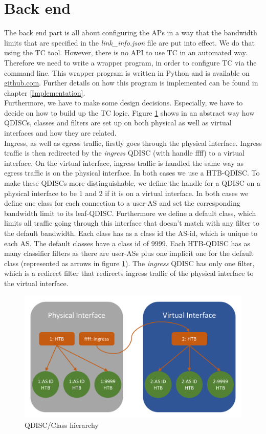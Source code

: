 \section{Back end}

The back end part is all about configuring the \acsp{AP} in a way that the bandwidth limits that are specified in the \textit{link\_info.json} file are put into effect. We do that using the \acs{TC} tool. However, there is no \acs{API} to use \acs{TC} in an automated way. Therefore we need to write a wrapper program, in order to configure \acs{TC} via the command line. This wrapper program is written in Python and is available on \href{https://github.com/ManuelMeinen/SCIONLab_Bandwidth_Limiter}{github.com}. Further details on how this program is implemented can be found in chapter \ref{Implementation}.
\\
Furthermore, we have to make some design decisions. Especially, we have to decide on how to build up the \acs{TC} logic. Figure \ref{QDISC-Set-up} shows in an abstract way how \acsp{QDISC}, classes and filters are set up on both physical as well as virtual interfaces and how they are related.
\\
Ingress, as well as egress traffic, firstly goes through the physical interface. Ingress traffic is then redirected by the \textit{ingress} \acs{QDISC} (with handle ffff) to a virtual interface. On the virtual interface, ingress traffic is handled the same way as egress traffic is on the physical interface. In both cases we use a \acs{HTB}-\acs{QDISC}. To make these \acsp{QDISC} more distinguishable, we define the handle for a \acs{QDISC} on a physical interface to be 1 and 2 if it is on a virtual interface. In both cases we define one class for each connection to a user-\acs{AS} and set the corresponding bandwidth limit to its leaf-\acs{QDISC}. Furthermore we define a default class, which limits all traffic going through this interface that doesn't match with any filter to the default bandwidth. Each class has as a class id the \acs{AS}-id, which is unique to each \acs{AS}. The default classes have a class id of 9999. Each \acs{HTB}-\acs{QDISC} has as many classifier filters as there are user-\acsp{AS} plus one implicit one for the default class (represented as arrows in figure \ref{QDISC-Set-up}). The \textit{ingress} \acs{QDISC} has only one filter, which is a redirect filter that redirects ingress traffic of the physical interface to the virtual interface.
\begin{figure}[h]
	\centering
	\includegraphics[width=\textwidth]{img/QDISC-Set-up.png}
	\caption{QDISC/Class hierarchy}
	\label{QDISC-Set-up}
\end{figure}